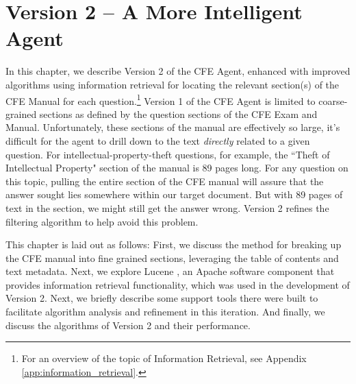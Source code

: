  
\chapter{Version 2 -- A More Intelligent Agent}

In this chapter, we describe Version 2 of the CFE Agent, enhanced with improved algorithms using information retrieval for locating the relevant section(s) of the CFE Manual for each question.\footnote{For an overview of the topic of Information Retrieval, see Appendix \ref{app:information_retrieval}.}  Version 1 of the CFE Agent is limited to coarse-grained sections as defined by the question sections of the CFE Exam and Manual.  Unfortunately, these sections of the manual are effectively so large, it's difficult for the agent to drill down to the text \emph{directly} related to a given question.  For intellectual-property-theft questions, for example, the ``Theft of Intellectual Property" section of the manual is 89 pages long.  For any question on this topic, pulling the entire section of the CFE manual will assure that the answer sought lies somewhere within our target document.  But with 89 pages of text in the section, we might still get the answer wrong.  Version 2 refines the filtering algorithm to help avoid this problem.



This chapter is laid out as follows:  First, we discuss the method for breaking up the CFE manual into fine grained sections, leveraging the table of contents and text metadata.  Next, we explore Lucene \cite{lucene}, an Apache software \cite{apache} component that provides information retrieval functionality, which was used in the development of Version 2.  Next, we briefly describe some support tools there were built to facilitate algorithm analysis and refinement in this iteration.  And finally, we discuss the algorithms of Version 2 and their performance.  

